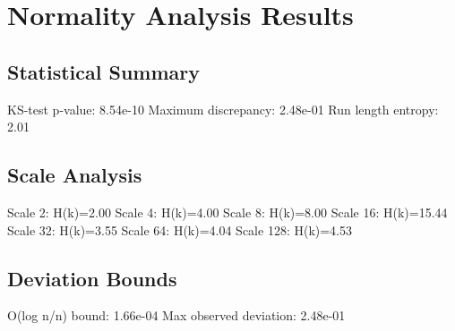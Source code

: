 \section{Normality Analysis Results}

\subsection{Statistical Summary}
KS-test p-value: 8.54e-10
Maximum discrepancy: 2.48e-01
Run length entropy: 2.01

\subsection{Scale Analysis}
Scale 2: H(k)=2.00
Scale 4: H(k)=4.00
Scale 8: H(k)=8.00
Scale 16: H(k)=15.44
Scale 32: H(k)=3.55
Scale 64: H(k)=4.04
Scale 128: H(k)=4.53
\subsection{Deviation Bounds}
O(log n/n) bound: 1.66e-04
Max observed deviation: 2.48e-01
